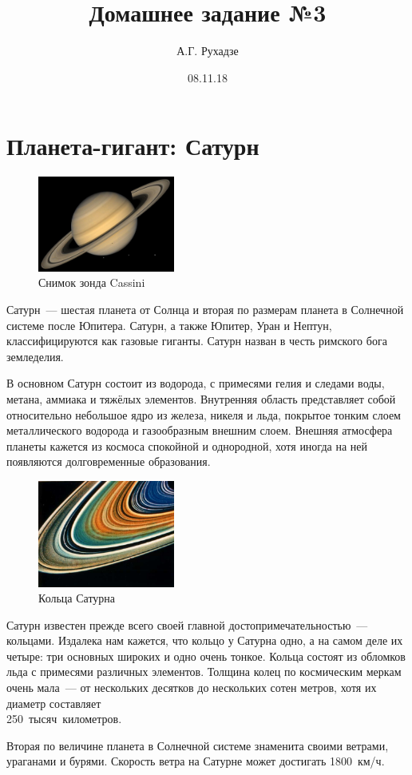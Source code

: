 \documentclass{article}
\title{Домашнее задание №3}
\author{А.Г. Рухадзе}
\date{08.11.18}
\begin{document}
	\maketitle
	
    \section{Планета-гигант: Сатурн} 
\setlength\parindent{0.75 cm}
\begin{figure}
\includegraphics[width = 0.4\textwidth]{img/Saturn}
\caption{Снимок зонда Cassini}
\end{figure}
Сатурн~--- шестая планета от Солнца и вторая по размерам планета в Солнечной системе после Юпитера. Сатурн, а также Юпитер, Уран и Нептун, классифицируются как газовые гиганты. Сатурн назван в честь римского бога земледелия. \par
В основном Сатурн состоит из водорода, с примесями гелия и следами воды, метана, аммиака и тяжёлых элементов. Внутренняя область представляет собой относительно небольшое ядро из железа, никеля и льда, покрытое тонким слоем металлического водорода и газообразным внешним слоем. Внешняя атмосфера планеты кажется из космоса спокойной и однородной, хотя иногда на ней появляются долговременные образования. \par
\begin{figure}
\includegraphics[width = 0.4\textwidth]{img/SaturnRings}
\caption{Кольца Сатурна}
\end{figure}
    Сатурн известен прежде всего своей главной достопримечательностью~--- кольцами. Издалека нам кажется, что кольцо у Сатурна одно, а на самом деле их четыре: три основных широких и одно очень тонкое. Кольца состоят из обломков льда с примесями различных элементов. Толщина колец по космическим меркам очень мала~--- от нескольких десятков до нескольких сотен метров, хотя их диаметр составляет \\250~тысяч~километров. \par
    Вторая по величине планета в Солнечной системе знаменита своими ветрами, ураганами и бурями. Скорость ветра на Сатурне может достигать 1800~км/ч.
    
\end{document}
